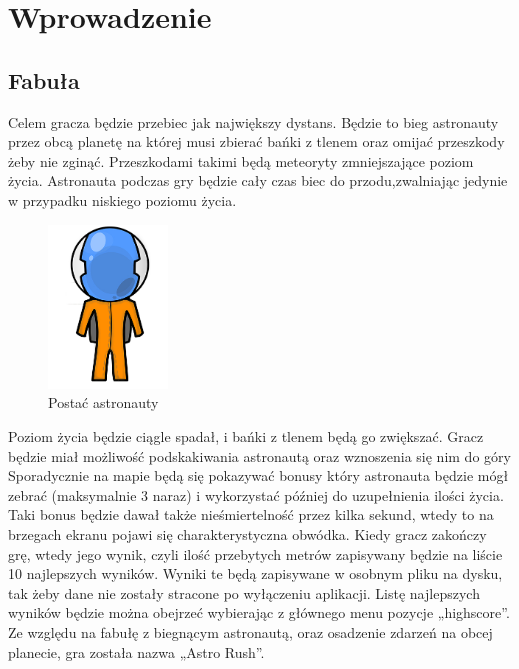 \setcounter{secnumdepth}{1}
\renewcommand{\chaptername}{Rozdział}
\chapter{Wprowadzenie} 

\section{Fabuła}

Celem gracza będzie przebiec jak największy dystans. Będzie to bieg astronauty przez obcą planetę na której musi zbierać bańki z tlenem oraz omijać przeszkody żeby nie zginąć. Przeszkodami takimi będą meteoryty zmniejszające poziom życia. Astronauta podczas gry będzie cały czas biec do przodu,zwalniając jedynie w przypadku niskiego poziomu życia.

\begin{figure}
\begin{center}
\includegraphics[width=120px]{./Pictures/astro.jpg}
\end{center}
\caption{Postać astronauty }
\label{Etykieta}
\end{figure}

Poziom życia będzie ciągle spadał, i bańki z tlenem będą go zwiększać. 
Gracz będzie miał możliwość podskakiwania astronautą oraz wznoszenia się nim do góry Sporadycznie na mapie będą się pokazywać bonusy który astronauta będzie mógł zebrać (maksymalnie 3 naraz) i wykorzystać później do uzupełnienia ilości życia. Taki bonus będzie dawał także nieśmiertelność przez kilka sekund, wtedy to na brzegach ekranu pojawi się charakterystyczna obwódka. Kiedy gracz zakończy grę, wtedy jego wynik, czyli ilość przebytych metrów zapisywany będzie na liście 10 najlepszych wyników. Wyniki te będą zapisywane w osobnym pliku na dysku, tak żeby dane nie zostały stracone po wyłączeniu aplikacji. Listę najlepszych wyników będzie można obejrzeć wybierając z głównego menu pozycje „highscore”. Ze względu na fabułę z biegnącym
astronautą, oraz osadzenie zdarzeń na obcej planecie, gra została nazwa „Astro Rush”.


